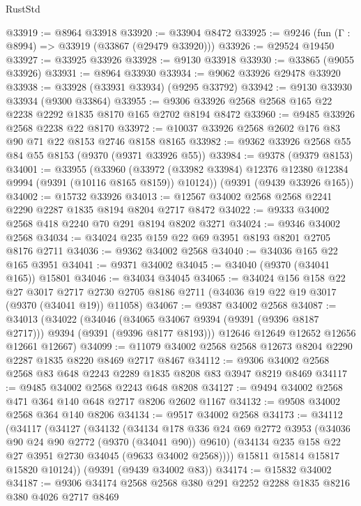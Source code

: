 \begin{lexlean}{RustStd}
\begin{coremodule}
@33919 := @8964 @33918
@33920 := @33904 @8472
@33925 := @9246 (fun (Γ : @8994) => @33919 (@33867 (@29479 @33920)))
@33926 := @29524 @19450
@33927 := @33925 @33926
@33928 := @9130 @33918
@33930 := @33865 (@9055 @33926)
@33931 := @8964 @33930
@33934 := @9062 @33926 @29478 @33920
@33938 := @33928 (@33931 @33934) (@9295 @33792)
@33942 := @9130 @33930 @33934 (@9300 @33864)
@33955 := @9306 @33926 @2568 @2568 @165 @22 @2238 @2292 @1835 @8170 @165 @2702 @8194 @8472
@33960 := @9485 @33926 @2568 @2238 @22 @8170
@33972 := @10037 @33926 @2568 @2602 @176 @83 @90 @71 @22 @8153 @2746 @8158 @8165
@33982 := @9362 @33926 @2568 @55 @84 @55 @8153 (@9370 (@9371 @33926 @55))
@33984 := @9378 (@9379 @8153)
@34001 := @33955
    (@33960 (@33972 (@33982 @33984) @12376 @12380 @12384 @9994 (@9391 (@10116 @8165 @8159)) @10124))
    (@9391 (@9439 @33926 @165))
@34002 := @15732 @33926
@34013 := @12567 @34002 @2568 @2568 @2241 @2290 @2287 @1835 @8194 @8204 @2717 @8472
@34022 := @9333 @34002 @2568 @418 @2240 @70 @291 @8194 @8202 @3271
@34024 := @9346 @34002 @2568
@34034 := @34024 @235 @159 @22 @69 @3951 @8193 @8201 @2705 @8176 @2711
@34036 := @9362 @34002 @2568
@34040 := @34036 @165 @22 @165 @3951
@34041 := @9371 @34002
@34045 := @34040 (@9370 (@34041 @165)) @15801
@34046 := @34034 @34045
@34065 := @34024
    @156
    @158
    @22
    @27
    @3017
    @2717
    @2730
    @2705
    @8186
    @2711
    (@34036 @19 @22 @19 @3017 (@9370 (@34041 @19)) @11058)
@34067 := @9387 @34002 @2568
@34087 := @34013
    (@34022
      (@34046 (@34065 @34067 @9394 (@9391 (@9396 @8187 @2717))) @9394 (@9391 (@9396 @8177 @8193)))
      @12646
      @12649
      @12652
      @12656
      @12661
      @12667)
@34099 := @11079 @34002 @2568 @2568 @12673 @8204 @2290 @2287 @1835 @8220 @8469 @2717 @8467
@34112 := @9306 @34002 @2568 @2568 @83 @648 @2243 @2289 @1835 @8208 @83 @3947 @8219 @8469
@34117 := @9485 @34002 @2568 @2243 @648 @8208
@34127 := @9494 @34002 @2568 @471 @364 @140 @648 @2717 @8206 @2602 @1167
@34132 := @9508 @34002 @2568 @364 @140 @8206
@34134 := @9517 @34002 @2568
@34173 := @34112
    (@34117
      (@34127
        (@34132
          (@34134
            @178
            @336
            @24
            @69
            @2772
            @3953
            (@34036 @90 @24 @90 @2772 (@9370 (@34041 @90)) @9610)
            (@34134 @235 @158 @22 @27 @3951 @2730 @34045 (@9633 @34002 @2568))))
        @15811
        @15814
        @15817
        @15820
        @10124))
    (@9391 (@9439 @34002 @83))
@34174 := @15832 @34002
@34187 := @9306 @34174 @2568 @2568 @380 @291 @2252 @2288 @1835 @8216 @380 @4026 @2717 @8469

\end{coremodule}
\end{lexlean}
